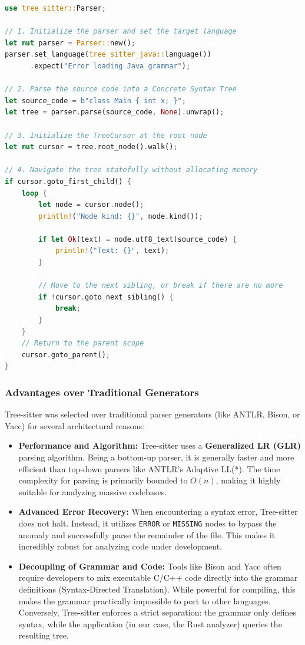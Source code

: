 \begin{lstlisting}[language=Rust,caption={Complete example of parsing source code and navigating the CST using Tree-sitter in Rust.},label={lst:tree_sitter_parsing}]
use tree_sitter::Parser;

// 1. Initialize the parser and set the target language
let mut parser = Parser::new();
parser.set_language(tree_sitter_java::language())
      .expect("Error loading Java grammar");

// 2. Parse the source code into a Concrete Syntax Tree
let source_code = b"class Main { int x; }";
let tree = parser.parse(source_code, None).unwrap();

// 3. Initialize the TreeCursor at the root node
let mut cursor = tree.root_node().walk();

// 4. Navigate the tree statefully without allocating memory
if cursor.goto_first_child() {
    loop {
        let node = cursor.node();
        println!("Node kind: {}", node.kind());

        if let Ok(text) = node.utf8_text(source_code) {
            println!("Text: {}", text);
        }

        // Move to the next sibling, or break if there are no more
        if !cursor.goto_next_sibling() {
            break;
        }
    }
    // Return to the parent scope
    cursor.goto_parent();
}
\end{lstlisting}

\subsubsection{Advantages over Traditional Generators}
Tree-sitter was selected over traditional parser generators (like
ANTLR, Bison, or Yacc) \cite{ortin_empirical_2022} for several
architectural reasons:

\begin{itemize}
  \item \textbf{Performance and Algorithm:} Tree-sitter uses a
    \textbf{Generalized LR (GLR)} parsing algorithm. Being a
    bottom-up parser, it is generally faster and
    more efficient than top-down parsers like ANTLR's Adaptive LL(*).
    The time complexity for parsing is primarily bounded to $O(n)$,
    making it highly suitable for analyzing massive codebases.
  \item \textbf{Advanced Error Recovery:} When encountering a syntax
    error, Tree-sitter does not halt. Instead, it utilizes
    \texttt{ERROR} or \texttt{MISSING} nodes to bypass the anomaly
    and successfully parse the remainder of the file. This makes it
    incredibly robust for analyzing code under development.
  \item \textbf{Decoupling of Grammar and Code:} Tools like Bison and
    Yacc often require developers to mix executable C/C++ code
    directly into the grammar definitions (Syntax-Directed
    Translation). While powerful for compiling, this makes the
    grammar practically impossible to port to other languages.
    Conversely, Tree-sitter enforces a strict separation: the grammar
    only defines syntax, while the application (in our case, the Rust
    analyzer) queries the resulting tree.
\end{itemize}

